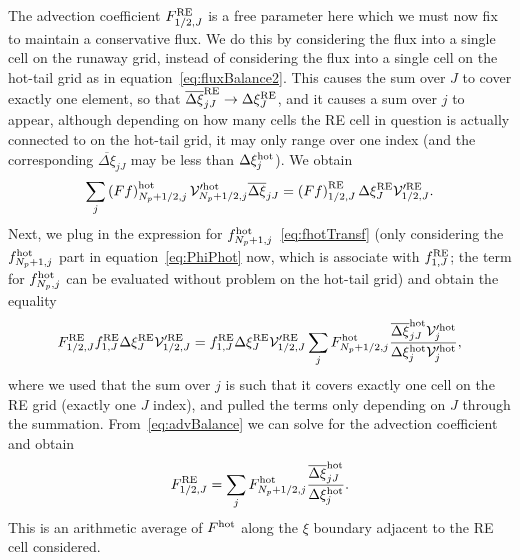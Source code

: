 \documentclass{notes}
\newcommand{\Vp}{\mathcal{V}'}
\begin{document}
    The advection coefficient $F^{\rm RE}_{1/2,J}$ is a free parameter here
    which we must now fix to maintain a conservative flux. We do this by
    considering the flux into a single cell on the runaway grid, instead of
    considering the flux into a single cell on the hot-tail grid as in
    equation~\eqref{eq:fluxBalance2}. This causes the sum over $J$ to cover
    exactly one element, so that $\overline{\Delta\xi}_{jJ}^{\rm RE}\to\Delta\xi_J^{\rm RE}$,
    and it causes a sum over $j$ to appear, although depending on how many cells
    the RE cell in question is actually connected to on the hot-tail grid, it
    may only range over one index (and the corresponding
    $\overline{\Delta\xi}_{jJ}$ may be less than $\Delta\xi^{\rm hot}_j$). We
    obtain
    \begin{equation}
        \sum_j \left( Ff \right)^{\rm hot}_{N_p+1/2,j} \Vp^{\rm hot}_{N_p+1/2,j} \overline{\Delta\xi}_{jJ} =
        \left( F f \right)^{\rm RE}_{1/2,J} \Delta\xi^{\rm RE}_J \Vp^{\rm RE}_{1/2,J}.
    \end{equation}
    Next, we plug in the expression for
    $f^{\rm hot}_{N_p+1,j}$~\eqref{eq:fhotTransf} (only considering the
    $f^{\rm hot}_{N_p+1,j}$ part in equation~\eqref{eq:PhiPhot} now, which is
    associate with $f^{\rm RE}_{1,J}$; the term for $f^{\rm hot}_{N_p,j}$ can be
    evaluated without problem on the hot-tail grid) and obtain the equality
    \begin{equation}\label{eq:advBalance}
        F^{\rm RE}_{1/2,J} f^{\rm RE}_{1,J} \Delta\xi^{\rm RE}_J \Vp^{\rm RE}_{1/2,J} =
        f_{1,J}^{\rm RE}\Delta\xi^{\rm RE}_J\Vp^{\rm RE}_{1/2,J}
        \sum_j F^{\rm hot}_{N_p+1/2,j} \frac{\overline{\Delta\xi}^{\rm hot}_{jJ}\Vp^{\rm hot}_j}
        {\Delta\xi^{\rm hot}_j\Vp^{\rm hot}_j},
    \end{equation}
    where we used that the sum over $j$ is such that it covers exactly one
    cell on the RE grid (exactly one $J$ index), and pulled the terms only
    depending on $J$ through the summation. From~\eqref{eq:advBalance} we can
    solve for the advection coefficient and obtain
    \begin{equation}\label{eq:avAdvection}
        F_{1/2,J}^{\rm RE} = \sum_j F^{\rm hot}_{N_p+1/2,j}
        \frac{\overline{\Delta\xi}^{\rm hot}_{jJ}}{\Delta\xi_j^{\rm hot}}.
    \end{equation}
    This is an arithmetic average of $F^{\rm hot}$ along the $\xi$
    boundary adjacent to the RE cell considered.
\end{document}
